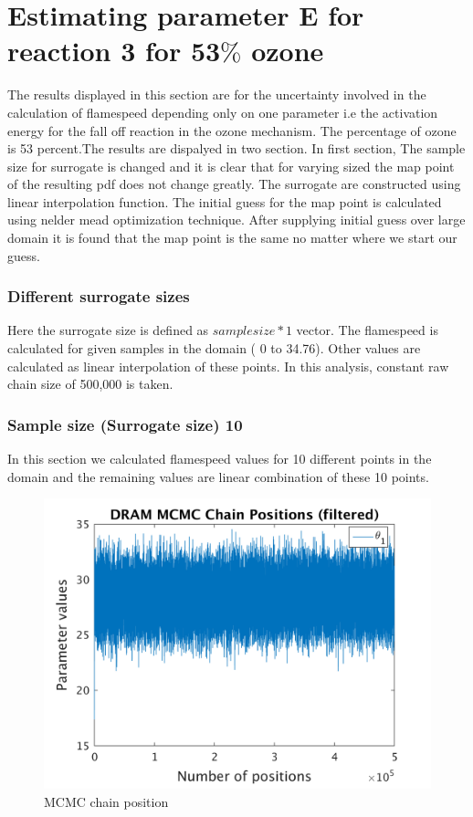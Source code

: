 \section{Estimating parameter E for reaction 3 for 53$\%$ ozone }

The results displayed in this section are for the uncertainty involved in the calculation of flamespeed depending only on one parameter i.e the activation energy for the fall off reaction in the ozone mechanism. The percentage of ozone is 53 percent.The results are dispalyed in two section. In first section, The sample size for surrogate is changed and it is clear that for varying sized the map point of the resulting pdf does not change greatly. The surrogate are constructed using linear interpolation function. The initial guess for the map point is calculated using nelder mead optimization technique. After supplying initial guess over large domain it is found that the map point is the same no matter where we start our guess. 
\bigskip

\subsubsection{Different surrogate sizes }

 Here the surrogate size is defined as $sample size*1$ vector. The flamespeed is calculated for given samples in the domain ( 0 to 34.76). Other values are calculated as linear interpolation of these points. In this analysis, constant raw chain size of 500,000 is taken. 
\subsubsection{Sample size (Surrogate size) 10 }
In this section we calculated flamespeed values for 10 different points in the domain and the remaining values are linear combination of these 10 points.  
\begin{figure}[H]
  
  \centering
   \includegraphics[scale=0.75]{53_results/output_10/simple_ip_chain_pos_filt}
   \caption{MCMC chain position }
\end{figure}


